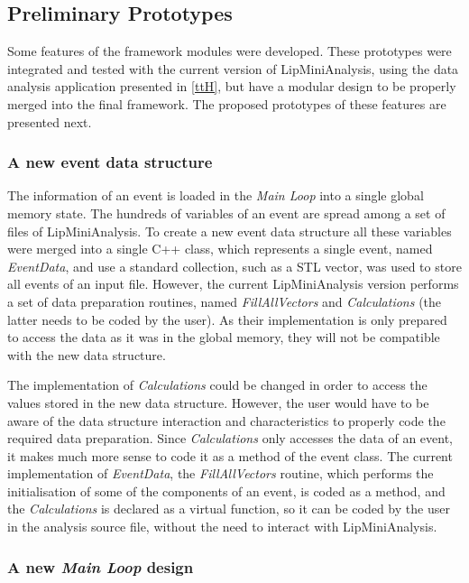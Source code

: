 \subsection{Preliminary Prototypes}
\label{work_so_far}

Some features of the framework modules were developed. These prototypes were integrated and tested with the current version of LipMiniAnalysis, using the \ttH data analysis application presented in \ref{ttH}, but have a modular design to be properly merged into the final framework. The proposed prototypes of these features are presented next.

\subsubsection*{A new event data structure}

The information of an event is loaded in the \textit{Main Loop} into a single global memory state. The hundreds of variables of an event are spread among a set of files of LipMiniAnalysis. To create a new event data structure all these variables were merged into a single C++ class, which represents a single event, named \textit{EventData}, and use a standard collection, such as a STL vector, was used to store all events of an input file. However, the current LipMiniAnalysis version performs a set of data preparation routines, named \textit{FillAllVectors} and \textit{Calculations} (the latter needs to be coded by the user). As their implementation is only prepared to access the data as it was in the global memory, they will not be compatible with the new data structure. 

The implementation of \textit{Calculations} could be changed in order to access the values stored in the new data structure. However, the user would have to be aware of the data structure interaction and characteristics to properly code the required data preparation. Since \textit{Calculations} only accesses the data of an event, it makes much more sense to code it as a method of the event class. The current implementation of \textit{EventData}, the \textit{FillAllVectors} routine, which performs the initialisation of some of the components of an event, is coded as a method, and the \textit{Calculations} is declared as a virtual function, so it can be coded by the user in the analysis source file, without the need to interact with LipMiniAnalysis.

\subsubsection*{A new \textit{Main Loop} design}

